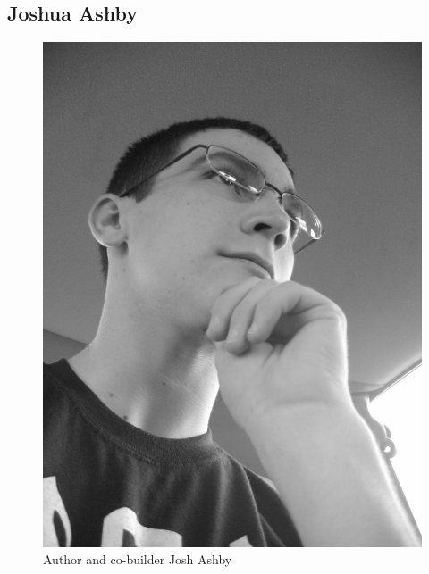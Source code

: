 \documentclass{article}
\begin{document}
\subsection{Joshua Ashby}
\begin{figure}[htp]
  \begin{center}
\includegraphics[scale=0.05]{josh}
  \end{center}
  \caption{Author and co-builder Josh Ashby}
\label{josh}
\end{figure}\\
\end{document}
